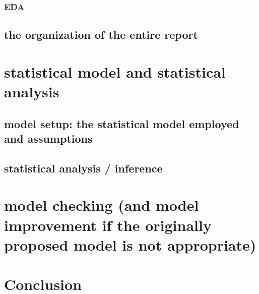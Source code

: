 \documentclass[11pt,notitlepage]{article}
\begin{document}
\subsubsection{EDA}


\subsection{the organization of the entire report}






\section{statistical model and statistical analysis}


\subsection{model setup: the statistical model employed and assumptions}


\subsection{statistical analysis / inference}






\section{model checking (and model improvement if the originally proposed model is not appropriate)}






\section{Conclusion}






\pagebreak

%
%
\end{document}
